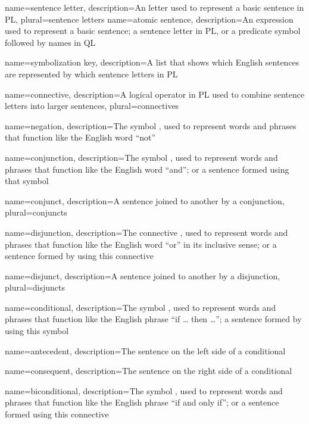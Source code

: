 {
name=sentence letter,
description={An letter used to represent a basic sentence in PL},
plural=sentence letters
}
{
name=atomic sentence,
description={An expression used to represent a basic sentence; a sentence letter in PL, or a predicate symbol followed by names in QL}
}

{
name=symbolization key,
description={A list that shows which English sentences are represented by which \glspl{sentence letter} in PL}
}

{
name=connective,
description={A logical operator in PL used to combine \glspl{sentence letter} into larger sentences},
plural=connectives
}

{
name=negation,
description={The symbol \enot, used to represent words and phrases that function like the English word ``not''}
}

{
name=conjunction,
description={The symbol \eand, used to represent words and phrases that function like the English word ``and''; or a sentence formed using that symbol}
}

{
name=conjunct,
description={A sentence joined to another by a \gls{conjunction}},
plural=conjuncts
}

{
name=disjunction,
description={The connective \eor, used to represent words and phrases that function like the English word ``or'' in its inclusive sense; or a sentence formed by using this connective}
}

{
name=disjunct,
description={A sentence joined to another by a \gls{disjunction}},
plural=disjuncts
}

{
name=conditional,
description={The symbol \eif, used to represent words and phrases that function like the English phrase ``if \dots{} then \dots''; a sentence formed by using this symbol}
}

{
name=antecedent,
description={The sentence on the left side of a \gls{conditional}}
}


{
name=consequent,
description={The sentence on the right side of a \gls{conditional}}
}

{
name=biconditional,
description={The symbol \eiff, used to represent words and phrases that function like the English phrase ``if and only if''; or a sentence formed using this connective}
}

